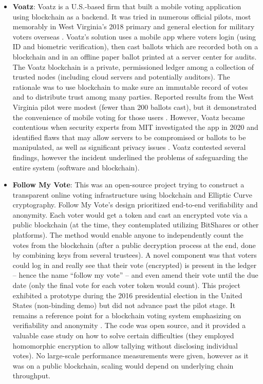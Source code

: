 \documentclass[a4paper,10pt]{report}
\begin{document}
\begin{itemize}
  \item \textbf{Voatz}: Voatz is a U.S.-based firm that built a mobile voting application using blockchain as a backend.  It was tried in numerous official pilots, most memorably in West Virginia’s 2018 primary and general election for military voters overseas \cite{voatz2018pilot}.  Voatz’s solution uses a mobile app where voters login (using ID and biometric verification), then cast ballots which are recorded both on a blockchain and in an offline paper ballot printed at a server center for audits.  The Voatz blockchain is a private, permissioned ledger among a collection of trusted nodes (including cloud servers and potentially auditors).  The rationale was to use blockchain to make sure an immutable record of votes and to distribute trust among many parties.  Reported results from the West Virginia pilot were modest (fewer than 200 ballots cast), but it demonstrated the convenience of mobile voting for those users \cite{voatz2018pilot,mit2020voatz}.  However, Voatz became contentious when security experts from MIT investigated the app in 2020 and identified flaws that may allow servers to be compromised or ballots to be manipulated, as well as significant privacy issues \cite{mit2020voatz}.  Voatz contested several findings, however the incident underlined the problems of safeguarding the entire system (software and blockchain).
  
  \item \textbf{Follow My Vote}: This was an open-source project trying to construct a transparent online voting infrastructure using blockchain and Elliptic Curve cryptography.  Follow My Vote’s design prioritized end-to-end verifiability and anonymity.  Each voter would get a token and cast an encrypted vote via a public blockchain (at the time, they contemplated utilizing BitShares or other platforms).  The method would enable anyone to independently count the votes from the blockchain (after a public decryption process at the end, done by combining keys from several trustees).  A novel component was that voters could log in and really see that their vote (encrypted) is present in the ledger – hence the name “follow my vote” – and even amend their vote until the due date (only the final vote for each voter token would count).  This project exhibited a prototype during the 2016 presidential election in the United States (non-binding demo) but did not advance past the pilot stage.  It remains a reference point for a blockchain voting system emphasizing on verifiability and anonymity \cite{followmyvote2016}.  The code was open source, and it provided a valuable case study on how to solve certain difficulties (they employed homomorphic encryption to allow tallying without disclosing individual votes).  No large-scale performance measurements were given, however as it was on a public blockchain, scaling would depend on underlying chain throughput.


\end{itemize}
\end{document}
